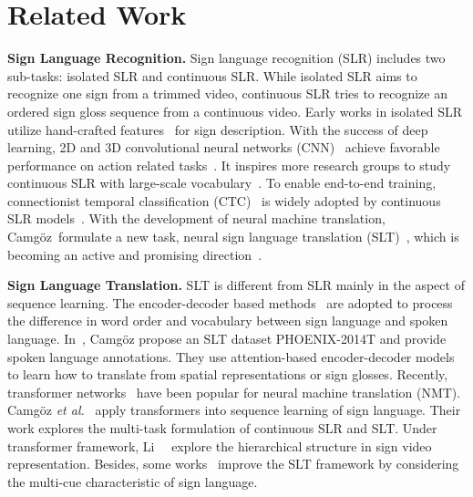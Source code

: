 \documentclass[final]{cvpr}
\begin{document}
\section{Related Work} \label{sec:related_work}
\textbf{Sign Language Recognition.} 
Sign language recognition (SLR) includes two sub-tasks: isolated SLR and continuous SLR. 
While isolated SLR aims to recognize one sign from a trimmed video, continuous SLR tries to recognize an ordered sign gloss sequence from a continuous video. 
Early works in isolated SLR utilize hand-crafted features~\cite{ong2005automatic,pami1998-sign} for sign description. 
With the success of deep learning, 2D and 3D convolutional neural networks (CNN)~\cite{I3D_Kinetics,yukai3d,vgg-two-stream} achieve favorable performance on action related tasks~\cite{I3D_Kinetics}. 
It inspires more research groups to study continuous SLR with large-scale vocabulary~\cite{staged,hmm-koller-tpami19,ian}.
To enable end-to-end training, connectionist temporal classification (CTC)~\cite{CTCLoss} is widely adopted by continuous SLR models~\cite{cslr-fcn-20fully,cui-tmm19,cslr-20-Stochastic,pu2020boosting,cslr-CTF-MM}. 
With the development of neural machine translation, Camgöz~\etal formulate a new task, neural sign language translation (SLT)~\cite{slt-nslt-cihan18}, which is becoming an active and promising direction~\cite{slt-trans-cihan20,tspnet-nips20}. 



\textbf{Sign Language Translation.} 
SLT is different from SLR mainly in the aspect of sequence learning. 
The encoder-decoder based methods~\cite{seq2seq-attn-Bahdanau,luong-seq2seq,seq2seq-Sutskever} are adopted to process the difference in word order and vocabulary between sign language and spoken language. 
In~\cite{slt-nslt-cihan18}, Camgöz \etal propose an SLT dataset PHOENIX-2014T and provide spoken language annotations. 
They use attention-based encoder-decoder models to learn how to translate from spatial representations or sign glosses. 
Recently, transformer networks~\cite{vaswani2017attention} have been popular for neural machine translation (NMT). 
Camgöz \textit{et al.}~\cite{slt-trans-cihan20} apply transformers into sequence learning of sign language. Their work explores the multi-task formulation of continuous SLR and SLT. 
Under transformer framework, Li~\etal~\cite{tspnet-nips20} explore the hierarchical structure in sign video representation. 
Besides, some works~\cite{slt-camgoz2020multi,stmc-tmm} improve the SLT framework by considering the multi-cue characteristic of sign language. 
\end{document}
